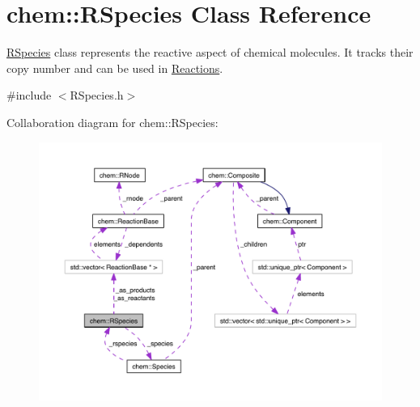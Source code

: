 \hypertarget{classchem_1_1RSpecies}{\section{chem\-:\-:R\-Species Class Reference}
\label{classchem_1_1RSpecies}
}


\hyperlink{classchem_1_1RSpecies}{R\-Species} class represents the reactive aspect of chemical molecules. It tracks their copy number and can be used in \hyperlink{classchem_1_1Reaction}{Reactions}.  




{\ttfamily \#include $<$R\-Species.\-h$>$}



Collaboration diagram for chem\-:\-:R\-Species\-:\nopagebreak
\begin{figure}[H]
\begin{center}
\leavevmode
\includegraphics[width=350pt]{classchem_1_1RSpecies__coll__graph}
\end{center}
\end{figure}

